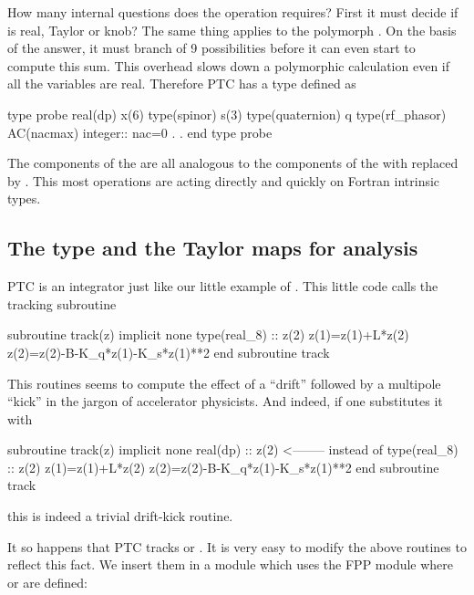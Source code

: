 \documentclass[english,12pt,article]{article} %
\begin{document}
{      How many internal questions does the \vn{+} operation requires?   First it must decide if  is real, Taylor or knob?  The same thing applies to the polymorph . On the basis of the answer, it must branch of 9 possibilities before it can even start to compute this sum.   This overhead slows down a polymorphic calculation even if all the variables are real.  Therefore PTC has a type  defined as
      
      \begin{example}
  type probe
     real(dp) x(6)
     type(spinor) s(3)
     type(quaternion) q
     type(rf_phasor)  AC(nacmax)
     integer:: nac=0
       .
       .
  end type probe
      \end{example}
      
      The components of the  are all analogous to the components of the  with  replaced by . This most operations are acting directly and quickly on Fortran intrinsic types.
      
 \subsection{The type {}  and the Taylor maps  {}   for analysis}\label{sec:taymap}
 
   PTC is an integrator  just like our little example of . This little code  calls the tracking subroutine 
   \begin{code}
      subroutine track(z)
      implicit none
      type(real_8) :: z(2) 
       z(1)=z(1)+L*z(2) 
       z(2)=z(2)-B-K_q*z(1)-K_s*z(1)**2 
      end subroutine track
    \end{code}

This routines seems to compute the effect of a ``drift'' followed by a multipole ``kick'' in the jargon of accelerator physicists.  And indeed, if one substitutes it with 
   \begin{code}
      subroutine track(z)
      implicit none
      real(dp) :: z(2)            <-------- instead of type(real_8) :: z(2) 
       z(1)=z(1)+L*z(2) 
       z(2)=z(2)-B-K_q*z(1)-K_s*z(1)**2 
      end subroutine track
    \end{code}
   this is indeed a trivial  drift-kick routine.   
    
It so happens that PTC tracks  or  .  It is very easy to modify the above routines to reflect this fact. We insert them in a module which  uses the FPP
module   where   or   are defined:

}
\end{document}
